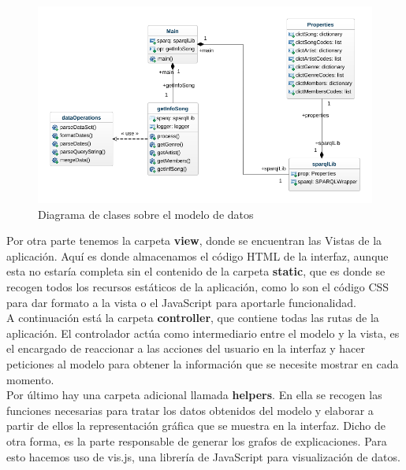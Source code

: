 \begin{figure}[h!]
	\centering
	\includegraphics[width = 1\textwidth]{Imagenes/Bitmap/class-diagram.png}
	\caption{Diagrama de clases sobre el modelo de datos}
	\label{fig:sampleImage}
\end{figure}

Por otra parte tenemos la carpeta \textbf{view}, donde se encuentran las Vistas de la aplicación. Aquí es donde almacenamos el código HTML de la interfaz, aunque esta no estaría completa sin el contenido de la carpeta \textbf{static}, que es donde se recogen todos los recursos estáticos de la aplicación, como lo son el código CSS para dar formato a la vista o el JavaScript para aportarle funcionalidad. \\

A continuación está la carpeta \textbf{controller}, que contiene todas las rutas de la aplicación. El controlador actúa como intermediario entre el modelo y la vista, es el encargado de reaccionar a las acciones del usuario en la interfaz y hacer peticiones al modelo para obtener la información que se necesite mostrar en cada momento. \\

Por último hay una carpeta adicional llamada \textbf{helpers}. En ella se recogen las funciones necesarias para tratar los datos obtenidos del modelo y elaborar a partir de ellos la representación gráfica que se muestra en la interfaz. Dicho de otra forma, es la parte responsable de generar los grafos de explicaciones. Para esto hacemos uso de vis.js, una librería de JavaScript para visualización de datos. \\



